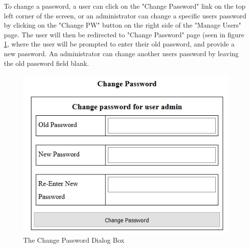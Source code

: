 \documentclass[]{article}
\begin{document}
		To change a password, a user can click on the "Change Password" link on the top left corner of the screen, or an administrator can change a specific users password by clicking on the "Change PW" button on the right side of the "Manage Users" page. The user will then be redirected to "Change Password" page (seen in figure \ref{changepassword}, where the user will be prompted to enter their old password, and provide a new password. An administrator can change another users password by leaving the old password field blank. 
		
		\begin{figure}[H]
			\caption{The Change Password Dialog Box}
			\label{changepassword}
			\centering
			\includegraphics{changepassword.PNG}
		\end{figure}
\end{document}
